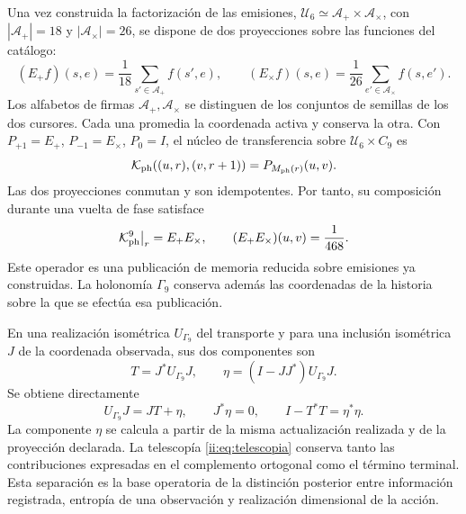 Una vez construida la factorización de las emisiones,
\(\mathcal U_6\simeq\mathcal A_+\times\mathcal A_\times\), con
\(|\mathcal A_+|=18\) y \(|\mathcal A_\times|=26\), se dispone de
dos proyecciones sobre las funciones del catálogo:
\[
 (E_+f)(s,e)=\frac1{18}\sum_{s'\in\mathcal A_+}f(s',e),\qquad
 (E_\times f)(s,e)=\frac1{26}\sum_{e'\in\mathcal A_\times}f(s,e').
\]
Los alfabetos de firmas \(\mathcal A_+,\mathcal A_\times\) se
distinguen de los conjuntos de semillas de los dos cursores.
Cada una promedia la coordenada activa y conserva la otra. Con
\(P_{+1}=E_+\), \(P_{-1}=E_\times\), \(P_0=I\), el núcleo
de transferencia sobre \(\mathcal U_6\times C_9\) es
\[
 \mathcal K_{\rm ph}((u,r),(v,r+1))=P_{M_{\rm ph}(r)}(u,v).
\]
Las dos proyecciones conmutan y son idempotentes. Por tanto, su composición
durante una vuelta de fase satisface
\begin{equation}
 \mathcal K_{\rm ph}^{9}\big|_r=E_+E_\times,\qquad
 (E_+E_\times)(u,v)=\frac1{468}.
 \label{ii:ii:tpk-renovacion}
\end{equation}
Este operador es una publicación de memoria reducida sobre emisiones ya
construidas. La holonomía \(\Gamma_9\) conserva además las
coordenadas de la historia sobre la que se efectúa esa publicación.

En una realización isométrica \(U_{\Gamma_9}\) del transporte y para
una inclusión isométrica \(J\) de la coordenada observada, sus dos
componentes son
\[
 T=J^*U_{\Gamma_9}J,\qquad
 \eta=(I-JJ^*)U_{\Gamma_9}J.
\]
Se obtiene directamente
\[
 U_{\Gamma_9}J=JT+\eta,\qquad J^*\eta=0,\qquad
 I-T^*T=\eta^*\eta.
\]
La componente \(\eta\) se calcula a partir de la misma actualización
realizada y de la proyección declarada. La telescopía
\eqref{ii:eq:telescopia} conserva tanto las contribuciones expresadas en el
complemento ortogonal como el término terminal. Esta separación es la
base operatoria de la distinción posterior entre información registrada,
entropía de una observación y realización dimensional de la acción.
